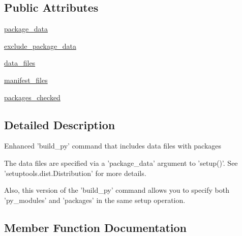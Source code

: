 \subsection*{Public Attributes}
\begin{DoxyCompactItemize}
\item 
\hyperlink{classsetuptools_1_1command_1_1build__py_1_1build__py_a8f8100423fe5e05b57219cc00bf02568}{package\+\_\+data}
\item 
\hyperlink{classsetuptools_1_1command_1_1build__py_1_1build__py_a33b6b204c8d3b70c09bbe86665dc15ec}{exclude\+\_\+package\+\_\+data}
\item 
\hyperlink{classsetuptools_1_1command_1_1build__py_1_1build__py_ac7bbc5fa976c30801af286a2321a063d}{data\+\_\+files}
\item 
\hyperlink{classsetuptools_1_1command_1_1build__py_1_1build__py_a66ea87dce6b5b5419f1558828bb92080}{manifest\+\_\+files}
\item 
\hyperlink{classsetuptools_1_1command_1_1build__py_1_1build__py_a748973ff26b6980cef5282fa66c3ba38}{packages\+\_\+checked}
\end{DoxyCompactItemize}


\subsection{Detailed Description}
\begin{DoxyVerb}Enhanced 'build_py' command that includes data files with packages

The data files are specified via a 'package_data' argument to 'setup()'.
See 'setuptools.dist.Distribution' for more details.

Also, this version of the 'build_py' command allows you to specify both
'py_modules' and 'packages' in the same setup operation.
\end{DoxyVerb}
 

\subsection{Member Function Documentation}
\mbox{\label{classsetuptools_1_1command_1_1build__py_1_1build__py_a2403cb67b7dea463615bcdafa21f14c3}} 
